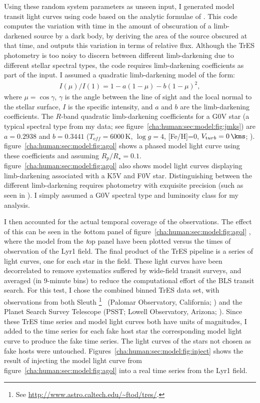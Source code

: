 Using these random system parameters as unseen input, I generated model transit light curves using code based on the analytic formulae of \citet{Mandel_Agol:apjl:2002a}.
This code computes the variation with time in the amount of obscuration of a limb-darkened source by a dark body, by deriving the area of the source obscured at that time, and outputs this variation in terms of relative flux.
Although the TrES photometry is too noisy to discern between different limb-darkening due to different stellar spectral types, the code requires limb-darkening coefficients as part of the input.
I assumed a quadratic limb-darkening model of the form:
\begin{eqnarray*}\label{cha:human:sec:model:eqn:limb}
I(\mu)/I(1) = 1-a(1-\mu)-b(1-\mu)^2,
\end{eqnarray*}
where $\mu=\cos{\gamma}$, $\gamma$ is the angle between the line of sight and the local normal to the stellar surface, $I$ is the specific intensity, and $a$ and $b$ are the limb-darkening coefficients.
The $R$-band quadratic limb-darkening coefficients for a G0V star (a typical spectral type from my data; see figure~\ref{cha:human:sec:model:fig:jmks}) are $a=0.2938$ and $b=0.3441$ ($T_{\mathrm eff}=6000$\,K, $\log{g}=4$, [Fe/H]=0, $V_{\mathrm turb}=0\,\kms$; \citealt{Claret:aa:2000a}).
figure~\ref{cha:human:sec:model:fig:agol} %
shows a phased model light curve using these coefficients and assuming $R_{p}/R_{\star}=0.1$.
figure~\ref{cha:human:sec:model:fig:agol} %
also shows model light curves displaying limb-darkening associated with a K5V and F0V star.
Distinguishing between the different limb-darkening requires photometry with exquisite precision (such as seen in \citealt{Brown_Charbonneau_Gilliland:apj:2001a}).
I simply assumed a G0V spectral type and luminosity class for my analysis.

I then accounted for the actual temporal coverage of the observations.
The effect of this can be seen in the {\textit bottom panel} of figure~\ref{cha:human:sec:model:fig:agol}%
, where the model from the {\textit top panel} have been plotted versus the times of observation of the Lyr1 field.
The final product of the TrES pipeline is a series of light curves, one for each star in the field.
These light curves have been decorrelated to remove systematics suffered by wide-field transit surveys, and averaged (in 9-minute bins) to reduce the computational effort of the BLS transit search.
For this test, I chose the combined binned TrES data set, with observations from both Sleuth%
\footnote{See \url{http://www.astro.caltech.edu/\~ftod/tres/}.}%
\ (Palomar Observatory, California; \citealt{ODonovan_Charbonneau_Kotredes:AIP:2004a}) and the Planet Search Survey Telescope (PSST;  Lowell Observatory, Arizona; \citealt{Dunham_Mandushev_Taylor:pasp:2004a}).
Since these TrES time series and model light curves both have units of magnitudes, I added to the time series for each fake host star the corresponding model light curve to produce the fake time series.
The light curves of the stars not chosen as fake hosts were untouched.
Figures~\ref{cha:human:sec:model:fig:inject} shows the result of injecting the model light curve from figure~\ref{cha:human:sec:model:fig:agol} %
into a real time series from the Lyr1 field.

